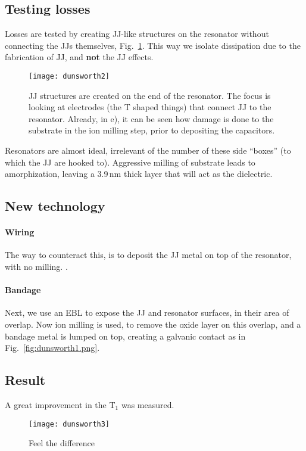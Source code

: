 \subsection{Testing losses}
\label{sec:testing-losses}

Losses are tested by creating JJ-like structures  on the resonator {without connecting the JJs
  themselves,  Fig.~\ref{fig:dunsworth2}.   This  way  we   isolate  dissipation  due  to  the
  fabrication of JJ, and \textbf{not} the JJ effects.}

\begin{figure}[h]
  \centering \texttt{[image: dunsworth2]}
  \caption{\small JJ structures are created on the  end of the resonator. The focus is looking
    at electrodes (the T shaped things) that connect  JJ to the resonator.  Already, in e), it
    can  be seen  how damage  is done  to  the substrate  in the  ion milling  step, prior  to
    depositing the capacitors.\label{fig:dunsworth2}}
\end{figure}

Resonators are almost ideal, irrelevant of the number of these side ``boxes'' (to which the JJ
are hooked to).   Aggressive milling of  substrate leads to amorphization, leaving a
3.9\,nm thick layer that will act as the dielectric.

\subsection{New technology}
\label{sec:new-technology}

\paragraph{Wiring}

The way  to counteract  this, is to  deposit the  JJ metal  on top of  the resonator,  with no
milling. .

\paragraph{Bandage}

Next, we use an EBL to expose the JJ and resonator surfaces, in their area of overlap. Now ion
milling is used, to remove  the oxide layer on this overlap, and a  bandage metal is lumped on
top, creating a galvanic contact as in Fig.~\ref{fig:dunsworth1.png}.

\subsection{Result}
\label{sec:result}

A great improvement in the T$_1$ was measured.

\begin{figure}[h]
  \centering \texttt{[image: dunsworth3]}
  \caption{\small Feel the difference\label{fig:dunsworth3}}
\end{figure}
